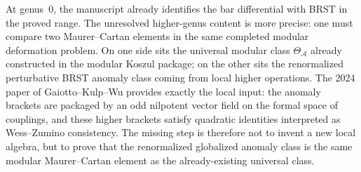 At genus~$0$, the manuscript already identifies the bar differential with
BRST in the proved range.  The unresolved higher-genus content is more
precise: one must compare two Maurer--Cartan elements in the same completed
modular deformation problem.
On one side sits the universal modular class $\Theta_{\mathcal A}$ already
constructed in the modular Koszul package; on the other sits the
renormalized perturbative BRST anomaly class coming from local higher
operations.  The 2024 paper of Gaiotto--Kulp--Wu provides exactly the local
input: the anomaly brackets are packaged by an odd nilpotent vector
field on the formal space of couplings, and these higher brackets satisfy
quadratic identities interpreted as Wess--Zumino consistency.
The missing step is therefore not to invent a new local algebra, but to
prove that the renormalized globalized anomaly class is the same modular
Maurer--Cartan element as the already-existing universal class.

